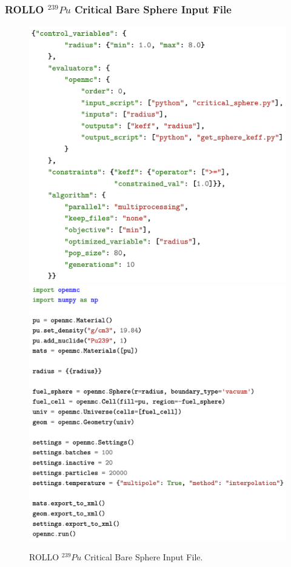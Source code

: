 \begin{frame}
    \frametitle{ROLLO $^{239}Pu$ Critical Bare Sphere Input File}
    \begin{figure}
        \includegraphics[width=0.49\linewidth]{figures/rollo-verify-file.png} 
        \includegraphics[width=0.49\linewidth]{figures/rollo-verify-file2.png}
        \caption{ROLLO $^{239}Pu$ Critical Bare Sphere Input File.}
    \end{figure}
\end{frame}

